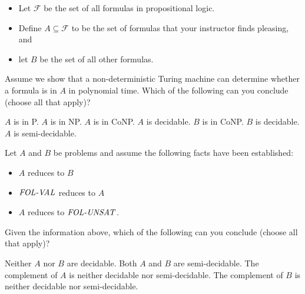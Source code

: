 \documentclass[addpoints]{exam}
\begin{document}
\begin{questions}
\clearpage
\question[6] 
\begin{itemize}
\item Let $\mathcal{F}$ be the set of all formulas in propositional logic.
\item Define $A \subseteq \mathcal{F}$ to be the set of formulas that your instructor
finds pleasing, and
\item let $B$ be the set of all other formulas.
\end{itemize}
Assume we show that a non-deterministic Turing machine can determine
whether a formula is in $A$ in polynomial time. Which of the following can you 
conclude (choose all that apply)?
\begin{checkboxes}
\choice $A$ is in P. 
\CorrectChoice $A$ is in NP. 
\choice $A$ is in CoNP. 
\CorrectChoice $A$ is decidable. 
\CorrectChoice $B$ is in CoNP. 
\CorrectChoice $B$ is decidable. 
\CorrectChoice $A$ is semi-decidable. 
\end{checkboxes}
\vspace{5mm}

\question[4] Let $A$ and $B$ be problems and assume the following facts have
been established:
\begin{itemize}
\item $A$ reduces to $B$
\item $\mbox{\it FOL-VAL\/}$ reduces to $A$
\item $A$ reduces to $\mbox{\it FOL-UNSAT\/}$.
\end{itemize}

Given the information above, which of the following can you conclude (choose all that apply)?
\begin{checkboxes}
\CorrectChoice Neither $A$ nor $B$ are decidable.
\choice  Both $A$ and $B$ are semi-decidable.
\CorrectChoice The complement of $A$ is neither decidable nor semi-decidable. 
\choice The complement of $B$ is neither decidable nor semi-decidable. 
\end{checkboxes}



\vspace{5mm}


\end{questions}
\end{document}
